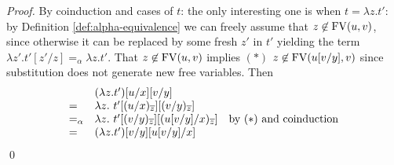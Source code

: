 \begin{proof} By coinduction and cases of $t$: the only interesting one is when
$t = \lambda z.t'$: by Definition \ref{def:alpha-equivalence} we can freely assume
that $z \not\in {{\rm FV}}(u,v)$, since otherwise it can be replaced by some fresh $z'$ in $t'$ yielding
the term $\lambda z'.t'[z'/z] =_\alpha \lambda z.t'$. That $z \not\in {{\rm FV}}(u,v)$ implies 
$(*)$ $z \not\in {{\rm FV}}(u[v/y],v)$ since substitution
does not generate new free variables. Then
\[\begin{array}{lll}
& (\lambda z.t') [u/x][v/y] \\
= & \lambda z. \ t' [(u/x)_{\overline{z}}][(v/y)_{\overline{z}}] \\
=_\alpha & \lambda z. \ t' [(v/y)_{\overline{z}}] [(u[v/y]/x)_{\overline{z}}] & \mbox{by $(*)$ and coinduction} \\
= &  (\lambda z.t') [v/y][u[v/y]/x]
\end{array}\]
%
%
\qed
\end{proof}
